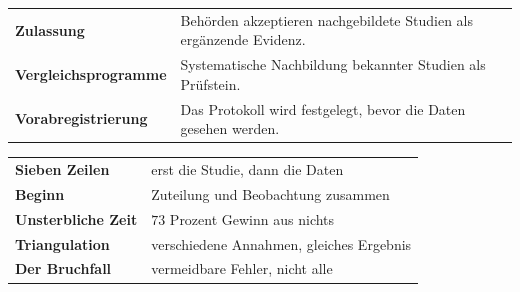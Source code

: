 \begin{forschung}
\begin{center}
{\small
\renewcommand{\arraystretch}{1.45}
\begin{tabular}{@{}P{3.4cm}P{4.8cm}@{}}
\toprule
\textbf{Zulassung} & Behörden akzeptieren nachgebildete Studien als ergänzende Evidenz.\\
\textbf{Vergleichs\-programme} & Systematische Nachbildung bekannter Studien als Prüfstein.\\
\textbf{Vorabregistrie\-rung} & Das Protokoll wird festgelegt, bevor die Daten gesehen werden.\\
\bottomrule
\end{tabular}}
\end{center}

\begin{center}
\begin{minipage}{0.88\textwidth}
\end{minipage}
\end{center}
\end{forschung}

\begin{merksatz}
\begin{center}
\renewcommand{\arraystretch}{1.5}
\begin{tabular}{@{}P{3.0cm}P{5.6cm}@{}}
\toprule
\textbf{Sieben Zeilen} & erst die Studie, dann die Daten\\
\textbf{Beginn} & Zuteilung und Beobachtung zusammen\\
\textbf{Unsterbliche Zeit} & $73$ Prozent Gewinn aus nichts\\
\textbf{Triangulation} & verschiedene Annahmen, gleiches Ergebnis\\
\textbf{Der Bruchfall} & vermeidbare Fehler, nicht alle\\
\bottomrule
\end{tabular}
\end{center}

\begin{center}
\begin{minipage}{0.88\textwidth}
\end{minipage}
\end{center}
\end{merksatz}
